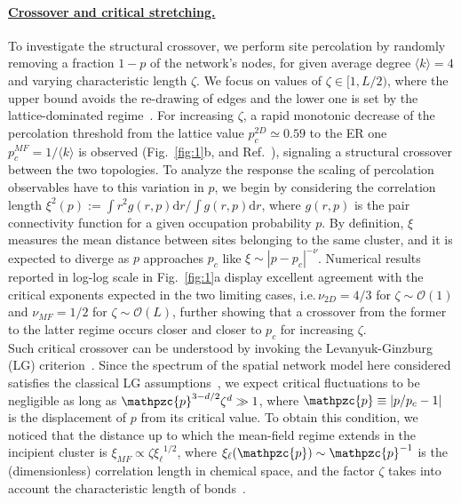 \documentclass[aps, groupedaddress, superscriptaddress, prl, reprint]{revtex4-1}
\begin{document}
\paragraph*{\underline{Crossover and critical stretching.}} 
To investigate the structural crossover, we perform site percolation by randomly removing a fraction $1-p$ %
of the network's nodes, for given average degree $\langle k\rangle=4$ and varying characteristic length $\zeta$.
We focus on values of $\zeta\in[1,L/2)$, where the upper bound avoids the re-drawing of edges and the lower one is set by the lattice-dominated regime~\cite{note1}.
For increasing $\zeta$, a rapid monotonic decrease of the percolation threshold from the lattice value $p_c^{2D}\simeq0.59$ to the ER one $p_c^{MF}=1/\langle k\rangle$ is observed (Fig.~\ref{fig:1}b, and Ref.~\cite{Dan016}), signaling a structural crossover between the two topologies. 
To analyze the response the scaling of percolation observables have to this variation in $p$, we begin by considering the correlation length $\xi^2(p):=\int r^2 g(r,p)\mathrm{d}r/\int g(r,p)\mathrm{d}r$, where $g(r,p)$ is the pair connectivity function for a given occupation probability $p$.
By definition, $\xi$ measures the mean distance between sites belonging to the same cluster, and it is expected to diverge as $p$ approaches $p_c$ like $\xi\sim|p-p_c|^{-\nu}$. 
Numerical results reported in log-log scale in Fig.~\ref{fig:1}a display excellent agreement with the critical exponents expected in the two limiting cases, i.e.\,$\nu_{2D}=4/3$ for $\zeta\sim\mathcal{O}(1)$ and $\nu_{MF}=1/2$ for $\zeta\sim\mathcal{O}(L)$, further showing that a crossover from the former to the latter regime occurs closer and closer to $p_c$ for increasing $\zeta$.\\
\indent 
Such critical crossover can be understood by invoking the Levanyuk-Ginzburg (LG) criterion~\cite{LGcrit}.
Since the spectrum of the spatial network model here considered satisfies the classical LG assumptions~\cite{bra010}, we expect critical fluctuations to be negligible as long as $\mathpzc{p}^{3-d/2}\zeta^d\gg1$, where $\mathpzc{p}\equiv |p/p_c-1|$ is the displacement of $p$ from its critical value. 
To obtain this condition, we noticed that the distance up to which the mean-field regime extends in the incipient cluster is $\xi_{MF}\propto\zeta{\xi_{\ell}}^{1/2}$, where $\xi_\ell(\mathpzc{p})\sim\mathpzc{p}^{-1}$ is the (dimensionless) correlation length in chemical space, and the factor $\zeta$ takes into account the characteristic length of bonds~\cite{note2}. 
\end{document}
